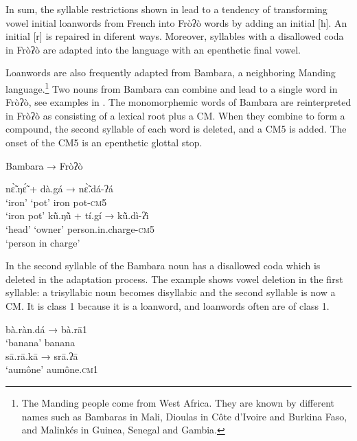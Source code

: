 \documentclass[output=paper]{langscibook}
\begin{document}
In sum, the syllable restrictions shown in  lead to a tendency of transforming vowel initial loanwords from French into Fròʔò words by adding an initial [h]. An initial [r] is repaired in diferent ways. Moreover, syllables with a disallowed coda in Fròʔò are adapted into the language with an epenthetic final vowel.

Loanwords are also frequently adapted from Bambara, a neighboring Manding language.\footnote{The Manding people come from West Africa. They are known by different names such as Bambaras in Mali, Dioulas in Côte d'Ivoire and Burkina Faso, and Malinkés in Guinea, Senegal and Gambia.}  Two nouns from Bambara can combine and lead to a single word in Fròʔò, see examples in . The monomorphemic words of Bambara are reinterpreted in Fròʔò as consisting of a lexical root plus a CM. When they combine to form a compound, the second syllable of each word is deleted, and a CM5 is added. The onset of the CM5 is an epenthetic glottal stop.  

\begin{exe}
        \ex Bambara    →    Fròʔò \label{ex:traore:45}
        \begin{xlist}
         \ex \gll nɛ̃̀.ŋɛ̃́      +     dà.gá            →           nɛ̃̀.dá-ʔá\\
          `iron'    {}        `pot'                   {}    {iron pot-\textsc{cm}5}\\
          \trans `iron pot'
          \ex \gll kũ̀.ŋũ̀      +     tí.gí              →         kũ̀.dì-ʔì\\
             `head'    {}       `owner'            {}         person.in.charge-\textsc{cm}5\\
            \trans `person in charge'
        \end{xlist}
\end{exe}

In  the second syllable of the Bambara noun has a disallowed coda which is deleted in the adaptation process. The example  shows vowel deletion in the first syllable: a trisyllabic noun becomes disyllabic and the second syllable is now a CM. It is class 1 because it is a loanword, and loanwords often are of class 1.

\begin{exe}
    \ex \label{ex:traore:46}
    \begin{xlist}
        \ex \gll bà.ràn.dá          →          bà.rā1 \label{ex:traore:46a}\\
                `banana'            {}          banana\\
        \ex \gll  sā.rā.kā            →           srā.ʔā \label{ex:traore:46b}\\
                 `aumône'           {}           aumône.\textsc{cm}1\\
    \end{xlist}
 \end{exe}
\end{document}
